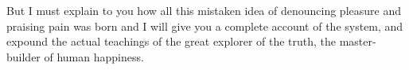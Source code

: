 \vfil\break



%






\startcanonpage{22pc}
\typosize[10/12]
\noindent But I must explain to you how all this mistaken idea of denouncing pleasure and praising pain was born and I will give you a complete account of the system, and expound the actual teachings of the great explorer of the truth, the master-builder of human happiness. 

